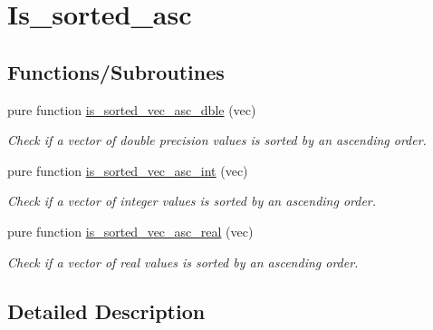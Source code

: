 \hypertarget{group__is__sorted__asc}{\section{Is\-\_\-sorted\-\_\-asc}
\label{group__is__sorted__asc}
}
\subsection*{Functions/\-Subroutines}
\begin{DoxyCompactItemize}
\item 
pure function \hyperlink{group__is__sorted__asc_gaf3d95274ddc8d1599184abb85157ff13_gaf3d95274ddc8d1599184abb85157ff13}{is\-\_\-sorted\-\_\-vec\-\_\-asc\-\_\-dble} (vec)
\begin{DoxyCompactList}\small\item\em Check if a vector of double precision values is sorted by an ascending order. \end{DoxyCompactList}\item 
pure function \hyperlink{group__is__sorted__asc_gaca30d9678b061a34bba7afe9a58185b2_gaca30d9678b061a34bba7afe9a58185b2}{is\-\_\-sorted\-\_\-vec\-\_\-asc\-\_\-int} (vec)
\begin{DoxyCompactList}\small\item\em Check if a vector of integer values is sorted by an ascending order. \end{DoxyCompactList}\item 
pure function \hyperlink{group__is__sorted__asc_ga00f553be8788f2e8938803475798dc81_ga00f553be8788f2e8938803475798dc81}{is\-\_\-sorted\-\_\-vec\-\_\-asc\-\_\-real} (vec)
\begin{DoxyCompactList}\small\item\em Check if a vector of real values is sorted by an ascending order. \end{DoxyCompactList}\end{DoxyCompactItemize}


\subsection{Detailed Description}


